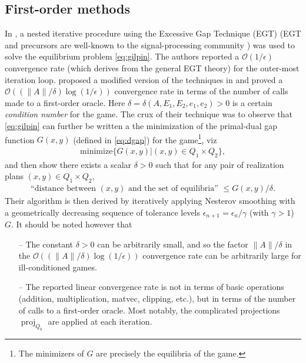 \documentclass[a4paper,9pt]{extarticle}
\DeclareMathOperator{\proj}{proj}
\begin{document}
\subsection{First-order methods}
In \cite{hoda2010smoothing}, a nested iterative procedure using the
Excessive Gap Technique (EGT) \cite{nesterov2005excessive} (EGT and
precursors are well-known to the signal-processing community
\cite{NESTA}) was used
to solve the equilibrium problem \eqref{eq:gilpin}.
The authors reported a $\mathcal{O}(1/\epsilon)$ convergence rate
(which derives from the general EGT theory) for the outer-most
iteration loop.
\cite{gilpinfirst} proposed a modified version of the techniques in
\cite{hoda2010smoothing} and  proved a $\mathcal{O}\left(\left(\|A\| /
\delta\right) \log \left(1 / \epsilon\right)\right)$ convergence rate in
terms of the number of calls made to a first-order oracle. Here
$\delta = \delta(A, E_1, E_2, e_1, e_2) > 0$ is a certain
\textit{condition number} for the game. The crux of their technique was to
observe that \eqref{eq:gilpin} can further be written a the minimization of
the primal-dual gap function $G(x, y)$ (defined in \eqref{eq:dgap})
for the game\footnote{The minimizers of $G$ are precisely the
  equilibria of the game.}, viz
\begin{eqnarray}
\mathrm{minimize}\{G(x,y)|(x,y) \in Q_1 \times Q_2\},
\end{eqnarray}
and then show there exists a scalar
$\delta > 0$ such that for any pair of realization plans $(x, y) \in Q_1 \times Q_2$,
\begin{eqnarray}
\text{``distance between }(x, y)\text{ and the set of
equilibria'' } \le G(x, y)/\delta.
\end{eqnarray}
Their
algorithm is then derived by iteratively applying Nesterov smoothing \cite{nesterov2005a}
with a geometrically decreasing sequence of tolerance levels
$\epsilon_{n+1} = \epsilon_n / \gamma$ (with $\gamma > 1$)  $G$. It
should be noted however that
\begin{itemize}
\item[--] The constant $\delta > 0$ can be arbitrarily small, and so
  the factor $\|A\| / \delta$ in the $\mathcal{O}\left(\left(\|A\| /
\delta\right) \log\left(1 / \epsilon\right)\right)$ convergence rate can
be arbitrarily large for ill-conditioned games.
\item[--] The reported linear convergence rate is not in terms of
  basic operations (addition, multiplication, matvec, clipping, etc.),
  but in terms of the number of calls to a first-order oracle. Most
  notably, the complicated projections $\proj_{Q_k}$ are applied at
  each iteration.%
\end{itemize}
\end{document}

